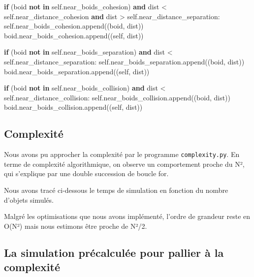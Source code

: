 \documentclass[
]{article}
\newenvironment{Shaded}{}{}
\newcommand{\ControlFlowTok}[1]{\textcolor[rgb]{0.00,0.44,0.13}{\textbf{#1}}}
\newcommand{\KeywordTok}[1]{\textcolor[rgb]{0.00,0.44,0.13}{\textbf{#1}}}
\newcommand{\NormalTok}[1]{#1}
\newcommand{\OperatorTok}[1]{\textcolor[rgb]{0.40,0.40,0.40}{#1}}
\newcommand{\VariableTok}[1]{\textcolor[rgb]{0.10,0.09,0.49}{#1}}
\begin{document}
\begin{Shaded}
\begin{Highlighting}[]
        \ControlFlowTok{if}\NormalTok{ (boid }\KeywordTok{not} \KeywordTok{in} \VariableTok{self}\NormalTok{.near\_boids\_cohesion) }\KeywordTok{and}\NormalTok{ dist }\OperatorTok{\textless{}} \VariableTok{self}\NormalTok{.near\_distance\_cohesion }\KeywordTok{and}\NormalTok{ dist }\OperatorTok{\textgreater{}} \VariableTok{self}\NormalTok{.near\_distance\_separation:}
            \VariableTok{self}\NormalTok{.near\_boids\_cohesion.append((boid, dist))}
\NormalTok{            boid.near\_boids\_cohesion.append((}\VariableTok{self}\NormalTok{, dist))}

        \ControlFlowTok{if}\NormalTok{ (boid }\KeywordTok{not} \KeywordTok{in} \VariableTok{self}\NormalTok{.near\_boids\_separation) }\KeywordTok{and}\NormalTok{ dist }\OperatorTok{\textless{}} \VariableTok{self}\NormalTok{.near\_distance\_separation:}
            \VariableTok{self}\NormalTok{.near\_boids\_separation.append((boid, dist))}
\NormalTok{            boid.near\_boids\_separation.append((}\VariableTok{self}\NormalTok{, dist))}

        \ControlFlowTok{if}\NormalTok{ (boid }\KeywordTok{not} \KeywordTok{in} \VariableTok{self}\NormalTok{.near\_boids\_collision) }\KeywordTok{and}\NormalTok{ dist }\OperatorTok{\textless{}} \VariableTok{self}\NormalTok{.near\_distance\_collision:}
            \VariableTok{self}\NormalTok{.near\_boids\_collision.append((boid, dist))}
\NormalTok{            boid.near\_boids\_collision.append((}\VariableTok{self}\NormalTok{, dist))}
\end{Highlighting}
\end{Shaded}

\hypertarget{complexituxe9}{%
\subsection{Complexité}\label{complexituxe9}}

Nous avons pu approcher la complexité par le programme
\texttt{complexity.py}. En terme de complexité algorithmique, on observe
un comportement proche du N², qui s'explique par une double succession
de boucle for.

Nous avons tracé ci-dessous le temps de simulation en fonction du nombre
d'objets simulés.

Malgré les optimisations que nous avons implémenté, l'ordre de grandeur
reste en O(N²) mais nous estimons être proche de N²/2.

\hypertarget{la-simulation-pruxe9calculuxe9e-pour-pallier-uxe0-la-complexituxe9}{%
\subsection{La simulation précalculée pour pallier à la
complexité}\label{la-simulation-pruxe9calculuxe9e-pour-pallier-uxe0-la-complexituxe9}}
\end{document}
